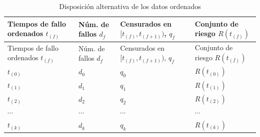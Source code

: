 \documentclass[
]{article}
\begin{document}
\begin{longtable}[]{@{}
  >{\raggedright\arraybackslash}p{}
  >{\raggedright\arraybackslash}p{}
  >{\raggedright\arraybackslash}p{}
  >{\raggedright\arraybackslash}p{}@{}}
\caption{Disposición alternativa de los datos ordenados}\tabularnewline
\toprule\noalign{}
\begin{minipage}[b]{\linewidth}\raggedright
Tiempos de fallo ordenados \(t_{(f)}\)
\end{minipage} & \begin{minipage}[b]{\linewidth}\raggedright
Núm. de fallos \(d_f\)
\end{minipage} & \begin{minipage}[b]{\linewidth}\raggedright
Censurados en \([t_{(f)}, t_{(f+1)})\), \(q_f\)
\end{minipage} & \begin{minipage}[b]{\linewidth}\raggedright
Conjunto de riesgo \(R(t_{(f)})\)
\end{minipage} \\
\midrule\noalign{}
\endfirsthead
\toprule\noalign{}
\begin{minipage}[b]{\linewidth}\raggedright
Tiempos de fallo ordenados \(t_{(f)}\)
\end{minipage} & \begin{minipage}[b]{\linewidth}\raggedright
Núm. de fallos \(d_f\)
\end{minipage} & \begin{minipage}[b]{\linewidth}\raggedright
Censurados en \([t_{(f)}, t_{(f+1)})\), \(q_f\)
\end{minipage} & \begin{minipage}[b]{\linewidth}\raggedright
Conjunto de riesgo \(R(t_{(f)})\)
\end{minipage} \\
\midrule\noalign{}
\endhead
\bottomrule\noalign{}
\endlastfoot
\(t_{(0)}\) & \(d_0\) & \(q_0\) & \(R(t_{(0)})\) \\
\(t_{(1)}\) & \(d_1\) & \(q_1\) & \(R(t_{(1)})\) \\
\(t_{(2)}\) & \(d_2\) & \(q_2\) & \(R(t_{(2)})\) \\
\(\cdots\) & \(\cdots\) & \(\cdots\) & \(\cdots\) \\
\(t_{(k)}\) & \(d_k\) & \(q_k\) & \(R(t_{(k)})\) \\
\end{longtable}
\end{document}
